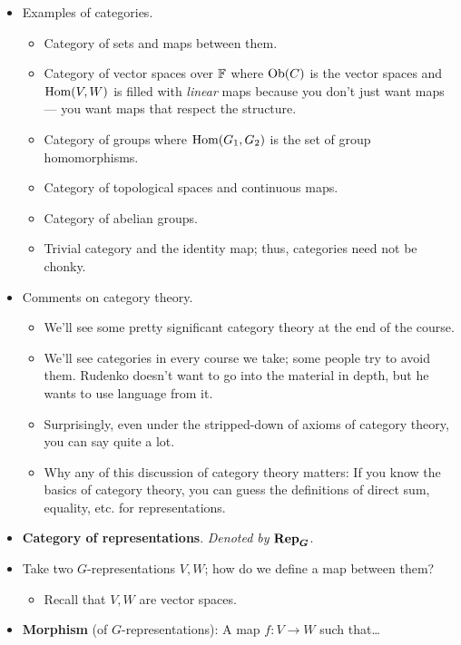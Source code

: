 \documentclass[../notes.tex]{subfiles}
\begin{document}
\begin{itemize}
\begin{itemize}
    \end{itemize}
    \item Examples of categories.
    \begin{itemize}
        \item Category of sets and maps between them.
        \item Category of vector spaces over $\mathbb{F}$ where $\operatorname{Ob}(C)$ is the vector spaces and $\operatorname{Hom}(V,W)$ is filled with \emph{linear} maps because you don't just want maps --- you want maps that respect the structure.
        \item Category of groups where $\operatorname{Hom}(G_1,G_2)$ is the set of group homomorphisms.
        \item Category of topological spaces and continuous maps.
        \item Category of abelian groups.
        \item Trivial category and the identity map; thus, categories need not be chonky.
    \end{itemize}
    \item Comments on category theory.
    \begin{itemize}
        \item We'll see some pretty significant category theory at the end of the course.
        \item We'll see categories in every course we take; some people try to avoid them. Rudenko doesn't want to go into the material in depth, but he wants to use language from it.
        \item Surprisingly, even under the stripped-down of axioms of category theory, you can say quite a lot.
        \item Why any of this discussion of category theory matters: If you know the basics of category theory, you can guess the definitions of direct sum, equality, etc. for representations.
    \end{itemize}
    \item \textbf{Category of representations}. \emph{Denoted by} $\bm{\Rep_G}$.
    \item Take two $G$-representations $V,W$; how do we define a map between them?
    \begin{itemize}
        \item Recall that $V,W$ are vector spaces.
    \end{itemize}
    \item \textbf{Morphism} (of $G$-representations): A map $f:V\to W$ such that\dots
    \begin{enumerate}

\end{enumerate}
\end{itemize}
\end{document}
